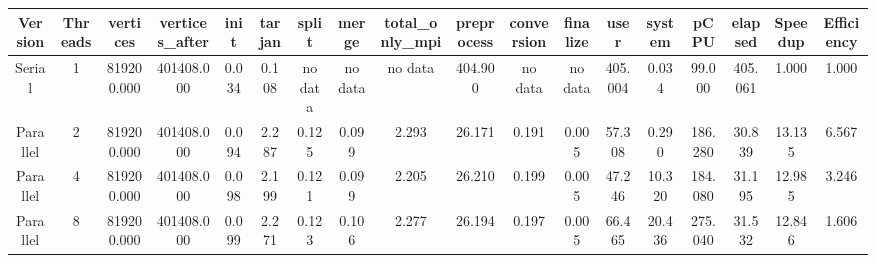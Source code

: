 \begin{tabular}{|c|c|c|c|c|c|c|c|c|c|c|c|c|c|c|c|c|c|}
\toprule
 Version &  Threads &   vertices &  vertices\_after &  init &  tarjan &   split &   merge & total\_only\_mpi &  preprocess & conversion & finalize &    user &  system &    pCPU &  elapsed &  Speedup &  Efficiency \\
\midrule
  Serial &        1 & 819200.000 &      401408.000 & 0.034 &   0.108 & no data & no data &        no data &     404.900 &    no data &  no data & 405.004 &   0.034 &  99.000 &  405.061 &    1.000 &       1.000 \\
Parallel &        2 & 819200.000 &      401408.000 & 0.094 &   2.287 &   0.125 &   0.099 &          2.293 &      26.171 &      0.191 &    0.005 &  57.308 &   0.290 & 186.280 &   30.839 &   13.135 &       6.567 \\
Parallel &        4 & 819200.000 &      401408.000 & 0.098 &   2.199 &   0.121 &   0.099 &          2.205 &      26.210 &      0.199 &    0.005 &  47.246 &  10.320 & 184.080 &   31.195 &   12.985 &       3.246 \\
Parallel &        8 & 819200.000 &      401408.000 & 0.099 &   2.271 &   0.123 &   0.106 &          2.277 &      26.194 &      0.197 &    0.005 &  66.465 &  20.436 & 275.040 &   31.532 &   12.846 &       1.606 \\
\bottomrule
\end{tabular}
